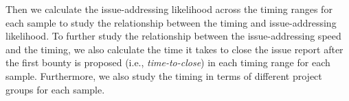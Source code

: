 Then we calculate the issue-addressing likelihood across the timing ranges for each sample to study the relationship between the timing and issue-addressing likelihood.
To further study the relationship between the issue-addressing speed and the timing, we also calculate the time it takes to close the issue report after the first bounty is proposed (i.e., \textit{time-to-close}) in each timing range for each sample.
Furthermore, we also study the timing in terms of different project groups for each sample.


